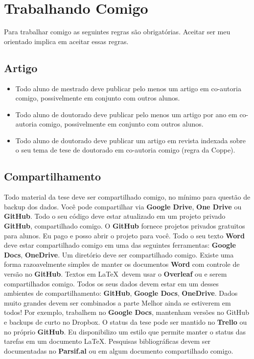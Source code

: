 	\chapter{Trabalhando Comigo}
Para trabalhar comigo as seguintes regras são obrigatórias. Aceitar ser meu orientado implica em aceitar essas regras.

\section{Artigo}

\begin{itemize}
    \item Todo aluno de mestrado deve publicar pelo menos um artigo em co-autoria comigo, possivelmente em conjunto com outros alunos.

    \item    Todo aluno de doutorado deve publicar pelo menos um artigo por ano em co-autoria comigo, possivelmente em conjunto com outros alunos.

    \item    Todo aluno de doutorado deve publicar um artigo em revista indexada sobre o seu tema de tese de doutorado em co-autoria comigo (regra da Coppe).

\end{itemize}

\section{Compartilhamento}
\begin{outline}
\1	Todo material da tese deve ser compartilhado comigo, no mínimo para questão de backup dos dados. Você pode compartilhar via \textbf{Google Drive}, \textbf{One Drive} ou \textbf{GitHub}.
\1	Todo o seu código deve estar atualizado em um projeto privado \textbf{GitHub}, compartilhado comigo. O \textbf{GitHub} fornece projetos privados gratuitos para alunos. Eu pago e posso abrir o projeto para você.
\1	Todo o seu texto \textbf{Word} deve estar compartilhado comigo em uma das seguintes ferramentas: \textbf{Google Docs}, \textbf{OneDrive}. Um diretório deve ser compartilhado comigo. Existe uma forma razoavelmente simples de manter os documentos \textbf{Word} com controle de versão no \textbf{GitHub}.
\1	Textos em \LaTeX\  devem usar o \textbf{Overleaf} ou \textbf{} e serem compartilhados comigo.
\1	Todos os seus dados devem estar em um desses ambientes de compartilhamento: \textbf{GitHub}, \textbf{Google Docs}, \textbf{OneDrive}.
\2	Dados muito grandes devem ser combinados a parte
\2	Melhor ainda se estiverem em todos! Por exemplo, trabalhem no \textbf{Google Docs}, mantenham versões no GitHub e backups de curto no Dropbox.
\1	O status da tese pode ser mantido no \textbf{Trello} ou no próprio \textbf{GitHub}.
\2 Eu disponibilizo um estilo que permite manter o status das tarefas em um documento \LaTeX.
\1	Pesquisas bibliográficas devem ser documentadas no \textbf{Parsif.al} ou em algum documento compartilhado comigo.
\end{outline}